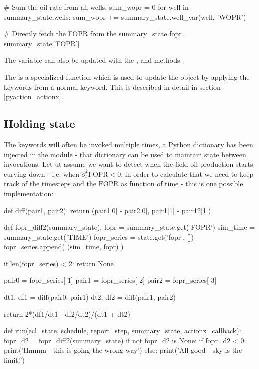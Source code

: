 \begin{description}
\begin{code}
    # Sum the oil rate from all wells.
    sum_wopr = 0
    for well in summary_state.wells:
        sum_wopr += summary_state.well_var(well, 'WOPR')

    # Directly fetch the FOPR from the summary_state
    fopr = summary_state['FOPR'] 
  \end{code}
  The  variable can also be updated with the
  ,  and
   methods.
\item[\inlinecode{actionx\_callback}:] The  is a
  specialized function which is used to update the  object
  by applying the keywords from a normal \actionx{} keyword. This is described
  in detail in section \ref{pyaction_actionx}.
\end{description}

\subsection{Holding state}
The \pyaction{} keywords will often be invoked multiple times, a Python
dictionary  has been injected in the module - that dictionary
can be used to maintain state between invocations. Let ut assume we want to
detect when the field oil production starts curving down - i.e. when
$\partial^2_{t} \mathrm{FOPR} < 0$, in order to calculate that we need to keep
track of the timesteps and the $\mathrm{FOPR}$ as function of time - this is one
possible implementation:
\begin{code}
def diff(pair1, pair2):
    return (pair1[0] - pair2[0], pair1[1] - pair12[1])   

def fopr_diff2(summary_state):
    fopr = summary_state.get('FOPR')
    sim_time = summary_state.get('TIME')
    fopr_series = state.get('fopr', [])
    fopr_series.append( (sim_time, fopr) )

    if len(fopr_series) < 2:
       return None

    pair0 = fopr_series[-1]
    pair1 = fopr_series[-2]
    pair2 = fopr_series[-3]

    dt1, df1 = diff(pair0, pair1)
    dt2, df2 = diff(pair1, pair2)

    return 2*(df1/dt1 - df2/dt2)/(dt1 + dt2)

def run(ecl_state, schedule, report_step, summary_state, actionx_callback):
    fopr_d2 = fopr_diff2(summary_state)
    if not fopr_d2 is None:
       if fopr_d2 < 0:
           print('Hmmm - this is going the wrong way')
       else:
           print('All good - sky is the limit!')
\end{code}

